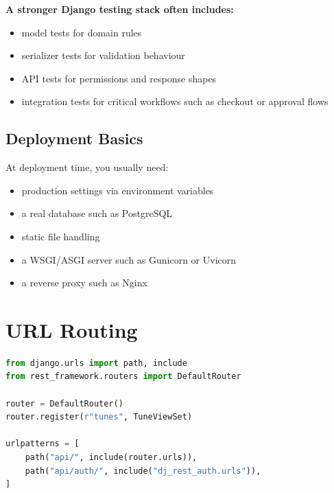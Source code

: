 \documentclass[12pt, a4paper, oneside]{book}
\begin{document}
\textbf{A stronger Django testing stack often includes:}
\begin{itemize}[leftmargin=2em]
    \item model tests for domain rules
    \item serializer tests for validation behaviour
    \item API tests for permissions and response shapes
    \item integration tests for critical workflows such as checkout or approval flows
\end{itemize}

\subsection{Deployment Basics}
At deployment time, you usually need:
\begin{itemize}[leftmargin=2em]
    \item production settings via environment variables
    \item a real database such as PostgreSQL
    \item static file handling
    \item a WSGI/ASGI server such as Gunicorn or Uvicorn
    \item a reverse proxy such as Nginx
\end{itemize}

\section{URL Routing}

\begin{lstlisting}[language=Python, caption={DRF URL routing}]
from django.urls import path, include
from rest_framework.routers import DefaultRouter

router = DefaultRouter()
router.register(r"tunes", TuneViewSet)

urlpatterns = [
    path("api/", include(router.urls)),
    path("api/auth/", include("dj_rest_auth.urls")),
]
\end{lstlisting}
\end{document}
